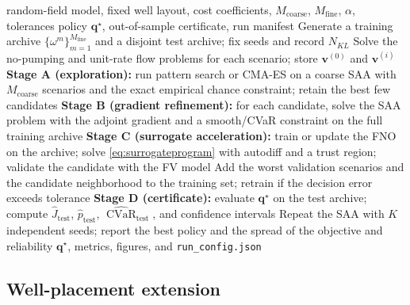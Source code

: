 \documentclass[11pt]{article}
\numberwithin{equation}{section}
\newcommand{\vv}{\mathbf{v}}
\newcommand{\CVaR}{\operatorname{CVaR}}
\theoremstyle{plain}
\begin{document}
\begin{algorithm}[htbp]
\caption{Hybrid stochastic optimization of the remediation policy}
\label{alg:hybrid}
\begin{algorithmic}[1]
\Require random-field model, fixed well layout, cost coefficients,
         $M_{\mathrm{coarse}}$, $M_{\mathrm{fine}}$, $\alpha$, tolerances
\Ensure policy $\mathbf{q}^\star$, out-of-sample certificate, run manifest
\State Generate a training archive $\{\omega^m\}_{m=1}^{M_{\mathrm{fine}}}$
       and a disjoint test archive; fix seeds and record $N_{KL}$
\State Solve the no-pumping and unit-rate flow problems for each scenario;
       store $\vv^{(0)}$ and $\vv^{(i)}$
\State \textbf{Stage A (exploration):} run pattern search or CMA-ES on a
       coarse SAA with $M_{\mathrm{coarse}}$ scenarios and the exact
       empirical chance constraint; retain the best few candidates
\State \textbf{Stage B (gradient refinement):} for each candidate, solve the
       SAA problem with the adjoint gradient and a smooth/CVaR constraint on
       the full training archive
  \State \textbf{Stage C (surrogate acceleration):} train or update the FNO on
         the archive; solve \eqref{eq:surrogateprogram} with autodiff and a
         trust region; validate the candidate with the FV model
  \State Add the worst validation scenarios and the candidate neighborhood to
         the training set; retrain if the decision error exceeds tolerance
\EndIf
\State \textbf{Stage D (certificate):} evaluate $\mathbf{q}^\star$ on the test
       archive; compute $\hat J_{\mathrm{test}}$, $\hat p_{\mathrm{test}}$,
       $\widehat{\CVaR}_{\mathrm{test}}$, and confidence intervals
\State Repeat the SAA with $K$ independent seeds; report the best policy and
       the spread of the objective and reliability
\State \Return $\mathbf{q}^\star$, metrics, figures, and
       \texttt{run\_config.json}
\end{algorithmic}
\end{algorithm}

\subsection{Well-placement extension}
\label{sec:placement}
\end{document}
